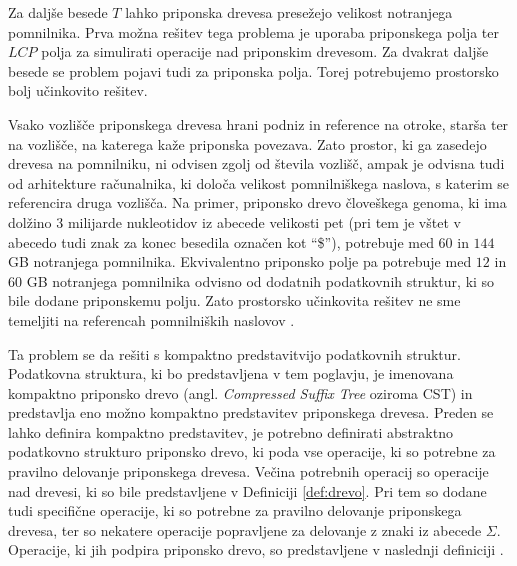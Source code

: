 Za daljše besede $T$ lahko priponska drevesa presežejo velikost notranjega pomnilnika. Prva možna rešitev tega problema je uporaba priponskega polja ter $LCP$ polja za simulirati operacije nad priponskim drevesom. Za dvakrat daljše besede se problem pojavi tudi za priponska polja. Torej potrebujemo prostorsko bolj učinkovito rešitev. 

Vsako vozlišče priponskega drevesa hrani podniz in reference na otroke, starša ter na vozlišče, na katerega kaže priponska povezava. Zato prostor, ki ga zasedejo drevesa na pomnilniku, ni odvisen zgolj od števila vozlišč, ampak je odvisna tudi od arhitekture računalnika, ki določa velikost pomnilniškega naslova, s katerim se referencira druga vozlišča. Na primer, priponsko drevo človeškega genoma, ki ima dolžino 3 milijarde nukleotidov iz abecede velikosti pet (pri tem je vštet v abecedo tudi znak za konec besedila označen kot \enquote{\$}), potrebuje med $60$ in $144$ GB notranjega pomnilnika. Ekvivalentno priponsko polje pa potrebuje med $12$ in $60$ GB notranjega pomnilnika odvisno od dodatnih podatkovnih struktur, ki so bile dodane priponskemu polju. Zato prostorsko učinkovita rešitev ne sme temeljiti na referencah pomnilniških naslovov \cite{GENOMEKNOWLEDGEHUB-2024-10-30}.

Ta problem se da rešiti s kompaktno predstavitvijo podatkovnih struktur. Podatkovna struktura, ki bo predstavljena v tem poglavju, je imenovana kompaktno priponsko drevo (angl. \textit{Compressed Suffix Tree} oziroma CST) in predstavlja eno možno kompaktno predstavitev priponskega drevesa. Preden se lahko definira kompaktno predstavitev, je potrebno definirati abstraktno podatkovno strukturo priponsko drevo, ki poda vse operacije, ki so potrebne za pravilno delovanje priponskega drevesa. Večina potrebnih operacij so operacije nad drevesi, ki so bile predstavljene v Definiciji \ref{def:drevo}. Pri tem so dodane tudi specifične operacije, ki so potrebne za pravilno delovanje priponskega drevesa, ter so nekatere operacije popravljene za delovanje z znaki iz abecede $\Sigma$. Operacije, ki jih podpira priponsko drevo, so predstavljene v naslednji definiciji \cite{Sadakane2007}.

